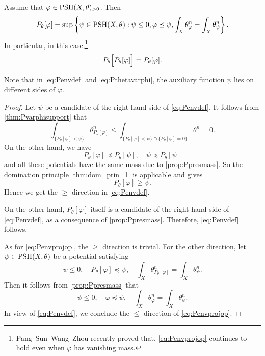 \begin{theorem}\label{thm:Pvarphidiffdef}
    Assume that $\varphi\in \mathrm{PSH}(X,\theta)_{>0}$. Then
    \begin{equation}\label{eq:Penvdef}
    P_{\theta}[\varphi]=\sup\left\{\psi\in \mathrm{PSH}(X,\theta): \psi\leq 0,\varphi\preceq \psi, \int_X \theta_{\varphi}^n=\int_X \theta_{\psi}^n\right\}.
    \end{equation}
    In particular, in this case,\footnote{Pang--Sun--Wang--Zhou \cite{PSWZ26} recently proved that, \eqref{eq:Penvprojop} continues to hold even when $\varphi$ has vanishing mass.}
    \begin{equation}\label{eq:Penvprojop}
    P_{\theta}\Bigl[P_{\theta}[\varphi]\Bigr]=P_{\theta}[\varphi].
    \end{equation}
\end{theorem}
Note that in \eqref{eq:Penvdef} and \eqref{eq:Pthetavarphi}, the auxiliary function $\psi$ lies on different sides of $\varphi$.
\begin{proof}
     Let $\psi$ be a candidate of the right-hand side of \eqref{eq:Penvdef}. It follows from \cref{thm:Pvarphisupport} that
     \[
     \int_{\{P_{\theta}[\varphi]<\psi \}} \theta_{P_{\theta}[\varphi]}^n\leq \int_{\{P_{\theta}[\varphi]<\psi \}\cap \{P_{\theta}[\varphi]=0\} } \theta^n=0.
     \]
     On the other hand, we have
    \[
    P_{\theta}[\varphi]\preceq P_{\theta}[\psi],\quad \psi\preceq P_{\theta}[\psi]
    \]
    and all these potentials have the same mass due to \cref{prop:Ppresmass}. So the domination principle \cref{thm:dom_prin_1} is applicable and gives
    \[
    P_{\theta}[\varphi]\geq \psi.
    \]
    Hence we get the $\geq$ direction in \eqref{eq:Penvdef}.

    On the other hand, $P_{\theta}[\varphi]$ itself is a candidate of the right-hand side of \eqref{eq:Penvdef}, as a consequence of \cref{prop:Ppresmass}. Therefore, \eqref{eq:Penvdef} follows.

    As for \eqref{eq:Penvprojop}, the $\geq$ direction is trivial. For the other direction, let $\psi\in \mathrm{PSH}(X,\theta)$ be a potential satisfying
    \[
    \psi\leq 0,\quad P_{\theta}[\varphi]\preceq \psi,\quad \int_X \theta_{P_{\theta}[\varphi]}^n=\int_X \theta_{\psi}^n.
    \]
    Then it follows from \cref{prop:Ppresmass} that
    \[
    \psi\leq 0,\quad \varphi\preceq \psi,\quad \int_X \theta_{\varphi}^n=\int_X \theta_{\psi}^n.
    \]
    In view of \eqref{eq:Penvdef}, we conclude the $\leq$ direction of \eqref{eq:Penvprojop}.
\end{proof}

